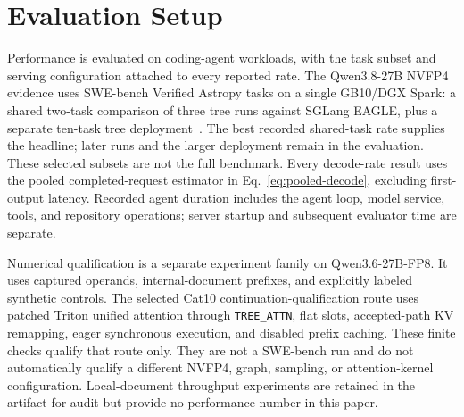 \documentclass[conference]{IEEEtran}
\begin{document}
\section{Evaluation Setup}
\label{sec:protocol}
Performance is evaluated on coding-agent workloads, with the task subset and serving configuration attached to every reported rate. The Qwen3.8-27B NVFP4 evidence uses SWE-bench Verified Astropy tasks on a single GB10/DGX Spark: a shared two-task comparison of three tree runs against SGLang EAGLE, plus a separate ten-task tree deployment~\cite{lumo2026archive,jimenez2024swe}. The best recorded shared-task rate supplies the headline; later runs and the larger deployment remain in the evaluation. These selected subsets are not the full benchmark. Every decode-rate result uses the pooled completed-request estimator in Eq.~\ref{eq:pooled-decode}, excluding first-output latency. Recorded agent duration includes the agent loop, model service, tools, and repository operations; server startup and subsequent evaluator time are separate.

Numerical qualification is a separate experiment family on Qwen3.6-27B-FP8. It uses captured operands, internal-document prefixes, and explicitly labeled synthetic controls. The selected Cat10 continuation-qualification route uses patched Triton unified attention through \texttt{TREE\_ATTN}, flat slots, accepted-path KV remapping, eager synchronous execution, and disabled prefix caching. These finite checks qualify that route only. They are not a SWE-bench run and do not automatically qualify a different NVFP4, graph, sampling, or attention-kernel configuration. Local-document throughput experiments are retained in the artifact for audit but provide no performance number in this paper.
\end{document}

